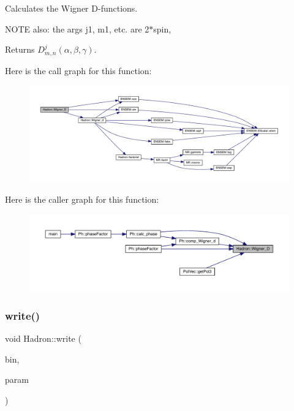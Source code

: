 Calculates the Wigner D-\/functions.

N\+O\+TE also\+: the args j1, m1, etc. are 2$\ast$spin,

\begin{DoxyReturn}{Returns}
$D^{j}_{m,n}(\alpha, \beta, \gamma)$. 
\end{DoxyReturn}
Here is the call graph for this function\+:
\nopagebreak
\begin{figure}[H]
\begin{center}
\leavevmode
\includegraphics[width=350pt]{d1/daf/namespaceHadron_a4d99a17c00bdddfc88a14c0571b74338_cgraph}
\end{center}
\end{figure}
Here is the caller graph for this function\+:
\nopagebreak
\begin{figure}[H]
\begin{center}
\leavevmode
\includegraphics[width=350pt]{d1/daf/namespaceHadron_a4d99a17c00bdddfc88a14c0571b74338_icgraph}
\end{center}
\end{figure}
\mbox{\label{namespaceHadron_a4073084eccc97c67b860f51e4efd91e0}} 
\subsubsection{\texorpdfstring{write()}{write()}\hspace{0.1cm}{\footnotesize\ttfamily [1/95]}}
{\footnotesize\ttfamily void Hadron\+::write (\begin{DoxyParamCaption}\item[{\mbox{\hyperlink{classADATIO_1_1BinaryWriter}{Binary\+Writer}} \&}]{bin,  }\item[{const \mbox{\hyperlink{structHadron_1_1KeyCGCPermS3__t}{Key\+C\+G\+C\+Perm\+S3\+\_\+t}} \&}]{param }\end{DoxyParamCaption})}



